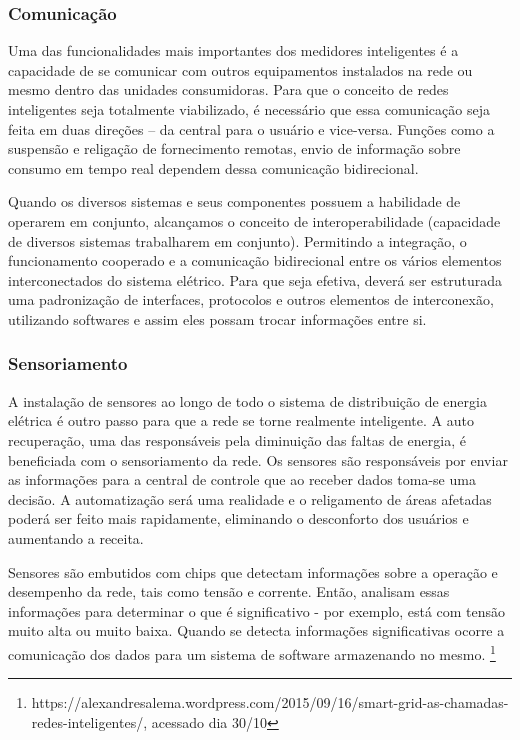 \subsubsection{Comunicação}

	Uma das funcionalidades mais importantes dos medidores inteligentes é a capacidade de se comunicar com outros equipamentos instalados na rede ou mesmo dentro das unidades consumidoras. Para que o conceito de redes inteligentes seja totalmente viabilizado, é necessário que essa comunicação seja feita em duas direções – da central para o usuário e vice-versa. Funções como a suspensão e religação de fornecimento remotas, envio de informação sobre consumo em tempo real dependem dessa comunicação bidirecional.

	Quando os diversos sistemas e seus componentes possuem a habilidade de operarem em conjunto, alcançamos o conceito de interoperabilidade (capacidade de diversos sistemas trabalharem em conjunto). Permitindo a integração, o funcionamento cooperado e a comunicação bidirecional entre os vários elementos interconectados do sistema elétrico. Para que seja efetiva, deverá ser estruturada uma padronização de interfaces, protocolos e outros elementos de interconexão, utilizando softwares e assim eles possam trocar informações entre si. 

\subsubsection{Sensoriamento}

	A instalação de sensores ao longo de todo o sistema de distribuição de energia elétrica é outro passo para que a rede se torne realmente inteligente. A auto recuperação, uma das responsáveis pela diminuição das faltas de energia, é beneficiada com o sensoriamento da rede. Os sensores são responsáveis por enviar as informações para a central de controle que ao receber dados toma-se uma decisão. A automatização será uma realidade e o religamento de áreas afetadas poderá ser feito mais rapidamente, eliminando o desconforto dos usuários e aumentando a receita.

	Sensores são embutidos com chips que detectam informações sobre a operação e desempenho da rede, tais como tensão e corrente. Então, analisam essas informações para determinar o que é significativo - por exemplo, está com tensão muito alta ou muito baixa. Quando se detecta informações significativas ocorre a comunicação dos dados para um sistema de software armazenando no mesmo. \footnote{https://alexandresalema.wordpress.com/2015/09/16/smart-grid-as-chamadas-redes-inteligentes/, acessado dia 30/10}

